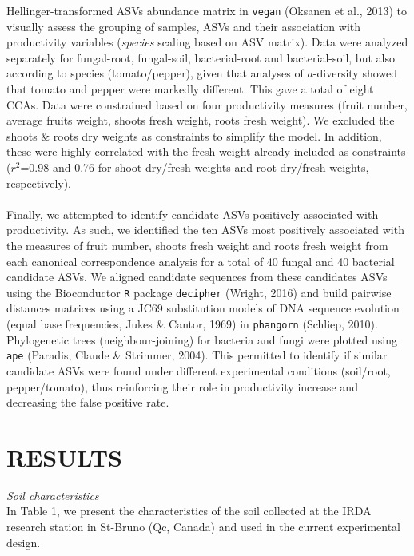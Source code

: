 \documentclass[11pt,]{article}
\begin{document}
Hellinger-transformed ASVs abundance matrix in \texttt{vegan} (Oksanen
et al., 2013) to visually assess the grouping of samples, ASVs and their
association with productivity variables (\emph{species} scaling based on
ASV matrix). Data were analyzed separately for fungal-root, fungal-soil,
bacterial-root and bacterial-soil, but also according to species
(tomato/pepper), given that analyses of \(a\)-diversity showed that
tomato and pepper were markedly different. This gave a total of eight
CCAs. Data were constrained based on four productivity measures (fruit
number, average fruits weight, shoots fresh weight, roots fresh weight).
We excluded the shoots \& roots dry weights as constraints to simplify
the model. In addition, these were highly correlated with the fresh
weight already included as constraints (\(r^2\)=0.98 and 0.76 for shoot
dry/fresh weights and root dry/fresh weights, respectively).\\
\hspace*{0.333em}\\
Finally, we attempted to identify candidate ASVs positively associated
with productivity. As such, we identified the ten ASVs most positively
associated with the measures of fruit number, shoots fresh weight and
roots fresh weight from each canonical correspondence analysis for a
total of 40 fungal and 40 bacterial candidate ASVs. We aligned candidate
sequences from these candidates ASVs using the Bioconductor \texttt{R}
package \texttt{decipher} (Wright, 2016) and build pairwise distances
matrices using a JC69 substitution models of DNA sequence evolution
(equal base frequencies, Jukes \& Cantor, 1969) in \texttt{phangorn}
(Schliep, 2010). Phylogenetic trees (neighbour-joining) for bacteria and
fungi were plotted using \texttt{ape} (Paradis, Claude \& Strimmer,
2004). This permitted to identify if similar candidate ASVs were found
under different experimental conditions (soil/root, pepper/tomato), thus
reinforcing their role in productivity increase and decreasing the false
positive rate.\\
\hspace*{0.333em}

\newpage  

\section{RESULTS}\label{results}

\emph{Soil characteristics}\\
In Table 1, we present the characteristics of the soil collected at the
IRDA research station in St-Bruno (Qc, Canada) and used in the current
experimental design.\\
\hspace*{0.333em}
\end{document}
